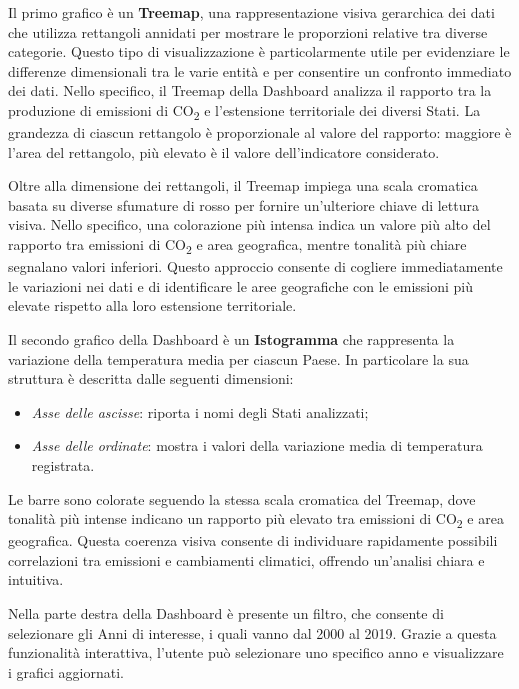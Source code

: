 Il primo grafico è un \textbf{Treemap}, una rappresentazione visiva gerarchica dei dati che utilizza rettangoli annidati per mostrare le proporzioni relative tra diverse categorie. Questo tipo di visualizzazione è particolarmente utile per evidenziare le differenze dimensionali tra le varie entità e per consentire un confronto immediato dei dati. Nello specifico, il Treemap della Dashboard analizza il rapporto tra la produzione di emissioni di CO\textsubscript{2} e l'estensione territoriale dei diversi Stati. La grandezza di ciascun rettangolo è proporzionale al valore del rapporto: maggiore è l'area del rettangolo, più elevato è il valore dell'indicatore considerato.

Oltre alla dimensione dei rettangoli, il Treemap impiega una scala cromatica basata su diverse sfumature di rosso per fornire un'ulteriore chiave di lettura visiva. Nello specifico, una colorazione più intensa indica un valore più alto del rapporto tra emissioni di CO\textsubscript{2} e area geografica, mentre tonalità più chiare segnalano valori inferiori. Questo approccio consente di cogliere immediatamente le variazioni nei dati e di identificare le aree geografiche con le emissioni più elevate rispetto alla loro estensione territoriale.

Il secondo grafico della Dashboard è un \textbf{Istogramma} che rappresenta la variazione della temperatura media per ciascun Paese.  In particolare la sua struttura è descritta dalle seguenti dimensioni:

\vspace{2mm}
\begin{itemize}
    \item \textit{Asse delle ascisse}: riporta i nomi degli Stati analizzati;
    \item \textit{Asse delle ordinate}: mostra i valori della variazione media di temperatura registrata.
\end{itemize}
\vspace{2mm} 

Le barre sono colorate seguendo la stessa scala cromatica del Treemap, dove tonalità più intense indicano un rapporto più elevato tra emissioni di CO\textsubscript{2} e area geografica. Questa coerenza visiva consente di individuare rapidamente possibili correlazioni tra emissioni e cambiamenti climatici, offrendo un'analisi chiara e intuitiva.

Nella parte destra della Dashboard è presente un filtro, che consente di selezionare gli Anni di interesse, i quali vanno dal 2000 al 2019. Grazie a questa funzionalità interattiva, l'utente può selezionare uno specifico anno e visualizzare i grafici aggiornati.

